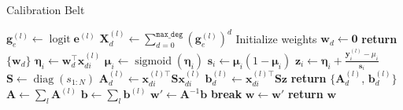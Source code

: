 \documentclass[10pt]{article}
\DeclareMathOperator*{\sigmoid}{sigmoid}
\DeclareMathOperator*{\diag}{diag}
\DeclareMathOperator*{\logit}{logit}
\begin{document}

\begin{algorithm}

  \caption{Calibration Belt}

  \begin{algorithmic}[1] %
                \State $\mathbf{g}_e^{(l)} \gets \logit \mathbf{e}^{(l)}$
                        \State $\mathbf{X}_d^{(l)} 
                        \gets \sum_{d=0}^{\texttt{max\_deg}} (\mathbf{g}_e^{(l)})^d$
                \EndFor
          \EndProcedure
          \EndFor
                 
                        \State Initialize weights $\mathbf{w}_d \gets \mathbf{0}$
                \EndFor
                \State \textbf{return} $\{\mathbf{w}_d\}$
          \EndProcedure
          \Loop
                          \State $\mathbf{\eta}_i \gets \mathbf{w}_d^{\top} \mathbf{x}_{di}^{(l)}$ 
                          \State $\mathbf{\mu}_i \gets \sigmoid(\mathbf{\eta}_i)$
                          \State $\mathbf{s}_i \gets \mathbf{\mu}_i (1 - \mathbf{\mu}_i)$
                          \State $\mathbf{z}_i \gets \mathbf{\eta}_i 
                                + \frac{\mathbf{y}_i^{(l)} - \mu_i}{\mathbf{s}_i}$
                          \State $\mathbf{S} \gets \diag(s_{1:N})$
                          \State $\mathbf{A}_d^{(l)} 
                                \gets \mathbf{x}_{di}^{(l)\top} \mathbf{S} \mathbf{x}_{di}^{(l)}$
                          \State $\mathbf{b}_d^{(l)} \gets \mathbf{x}_{di}^{(l)\top} \mathbf{S} \mathbf{z}$
                          \State \textbf{return} $\{ \mathbf{A}_d^{(l)}$, $\mathbf{b}_d^{(l)} \}$
                  \EndFor
                  \EndProcedure
                \EndFor
                          \State $\mathbf{A} \gets \sum_l \mathbf{A}^{(l)}$
                          \State $\mathbf{b} \gets \sum_l \mathbf{b}^{(l)}$
                          \State $\mathbf{w'} \gets \mathbf{A}^{-1} \mathbf{b}$
                                  \State \textbf{break}
                          \EndIf
                          \State $\mathbf{w} \gets \mathbf{w'}$ 
                          \State \textbf{return} $\mathbf{w}$
                  \EndProcedure
          \EndLoop
  \end{algorithmic}

\end{algorithm}
\end{document}
